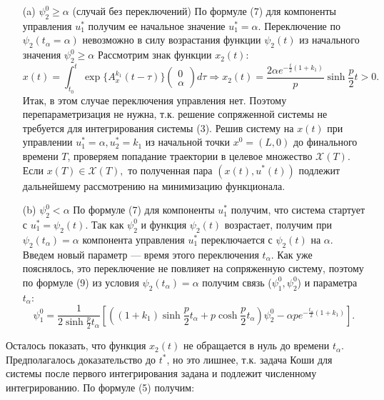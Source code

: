 \documentclass[11pt]{article}
\begin{document}
{ 	\begin{itemize}
 		\item [(a)]{$\psi_2^0\geq \alpha$ (случай без переключений)
 		\newline
 		По формуле (7) для компоненты управления $u_1^*$ получим ее начальное значение $u_1^*= \alpha$. Переключение по $\psi_2(t_{\alpha} = \alpha)$ невозможно в силу возрастания функции $\psi_2(t)$ из начального значения $\psi_2^0 \geq \alpha$
 		\newline
 		Рассмотрим знак функции $x_2(t):$
 		\begin{equation}
 		x(t) = \int_{t_0}^{t}\exp\{A_x^{k_1}(t - \tau)\}\begin{pmatrix}
 		0\\
 		\alpha
 		\end{pmatrix}d\tau
 		\Rightarrow x_2(t) = \frac{2\alpha e^{-\frac{t}{2}(1 + k_1)}}{p}\sinh\frac{p}{2}t > 0.
 		\end{equation}
 		Итак, в этом случае переключения управления нет. Поэтому перепараметризация не нужна, т.к. решение сопряженной системы не требуется для интегрирования системы (3). Решив систему на $x(t)$ при управлении $u_1^* = \alpha,u_2^* = k_1$ из начальной точки $x^0 = (L,0)$ до финального времени $T$, проверяем попадание траектории в целевое множество $\mathcal{X}(T).$ Если $x(T)\in \mathcal{X}(T), $ то полученная пара $(x(t),u^*(t))$ подлежит дальнейшему рассмотрению на минимизацию функционала. 	
 	}
 		\item [(b)]{$\psi_2^0 < \alpha$
 		\newline
 		По формуле (7) для компоненты $u_1^*$ получим, что система стартует с $u_1^* = \psi_2(t).$ Так как $\psi_2^0$ и функция $\psi_2(t)$ возрастает, получим при $\psi_2(t_{\alpha}) = \alpha$ компонента управления $u_1^*$ переключается с $\psi_2(t)$ на $\alpha.$ Введем новый параметр --- время этого переключения $t_{\alpha}.$ Как уже пояснялось, это переключение не повлияет на сопряженную систему, поэтому по формуле (9) из условия $\psi_2(t_{\alpha}) = \alpha$ получим связь ($\psi_1^0,\psi_2^0$) и параметра $t_{\alpha}:$
 		\begin{equation}
 		\psi_1^0 = \frac{1}{2\sinh\frac{p}{2}t_{\alpha}}[((1 + k_1)\sinh\frac{p}{2}t_{\alpha} + p\cosh\frac{p}{2}t_{\alpha})\psi_2^0 - \alpha pe^{-\frac{t_{\alpha}}{2}(1 + k_1)}].
 		\end{equation} 
 	}
 	\end{itemize}
 	Осталось показать, что функция $x_2(t)$ не обращается в нуль до времени $t_{\alpha}$. Предполагалось доказательство до $t^*$, но это лишнее, т.к. задача Коши для системы после первого интегрирования задана и подлежит численному интегрированию. По формуле (5) получим:
}
\end{document}

